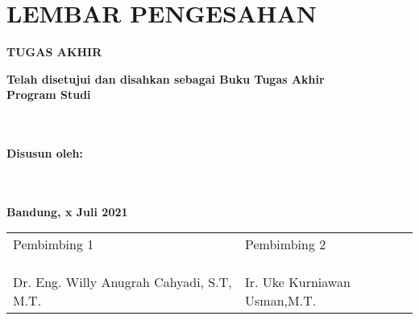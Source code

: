 \chapter*{LEMBAR PENGESAHAN} %


\begin{center} %
	\large
	\textbf{TUGAS AKHIR}
	\bigskip
	
	\Large
	\textbf{\JUDUL}
	\bigskip
	
	\textbf{\textit{\JUDULENG}}
	\bigskip
	\bigskip
	\bigskip
	
	\normalsize
	\textbf{Telah disetujui dan disahkan sebagai Buku Tugas Akhir}\\
	\textbf{Program Studi \prodi}\\
	\textbf{\fakultas}\\
	\textbf{\universitas}\\
	\bigskip
	\bigskip
	
	\textbf{Disusun oleh:}\\
	\textbf{\PENULIS}\\
	\textbf{\nim}\\
	\bigskip
	\bigskip
	
	\textbf{Bandung, x Juli 2021}\\
	\begin{tabular}{|p{6cm}|p{6cm}|}
		\hline
		Pembimbing 1 & Pembimbing 2 \\
		& \\
		& \\
		& \\
		Dr. Eng. Willy Anugrah Cahyadi, S.T, M.T. & Ir. Uke Kurniawan Usman,M.T. \\
		\hline
	\end{tabular}
\end{center}

